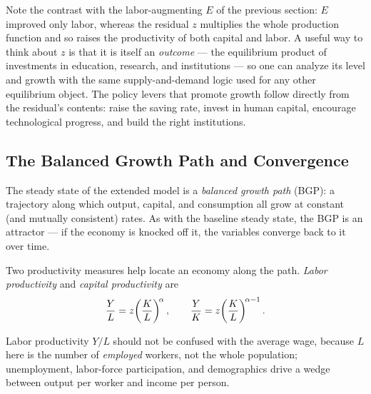 
Note the contrast with the labor-augmenting $E$ of the previous section: $E$ improved only labor, whereas the residual $z$ multiplies the whole production function and so raises the productivity of both capital and labor. A useful way to think about $z$ is that it is itself an \emph{outcome} --- the equilibrium product of investments in education, research, and institutions --- so one can analyze its level and growth with the same supply-and-demand logic used for any other equilibrium object. The policy levers that promote growth follow directly from the residual's contents: raise the saving rate, invest in human capital, encourage technological progress, and build the right institutions.

\subsection{The Balanced Growth Path and Convergence}

The steady state of the extended model is a \emph{balanced growth path} (BGP): a trajectory along which output, capital, and consumption all grow at constant (and mutually consistent) rates. As with the baseline steady state, the BGP is an attractor --- if the economy is knocked off it, the variables converge back to it over time.

Two productivity measures help locate an economy along the path. \emph{Labor productivity} and \emph{capital productivity} are
\[
\frac{Y}{L} = z\!\left(\frac{K}{L}\right)^{\!\alpha},
\qquad
\frac{Y}{K} = z\!\left(\frac{K}{L}\right)^{\!\alpha - 1}.
\]

\begin{remark}
Labor productivity $Y/L$ should not be confused with the average wage, because $L$ here is the number of \emph{employed} workers, not the whole population; unemployment, labor-force participation, and demographics drive a wedge between output per worker and income per person.
\end{remark}

